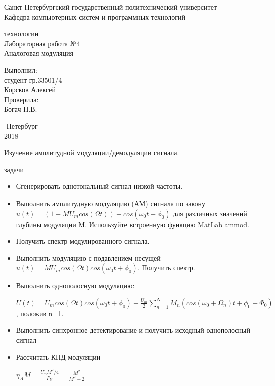 \documentclass[a4paper,12pt]{article}
\begin{document}
\begin{center}
Санкт-Петербургский государственный политехнический университет
\\Кафедра компьютерных систем и программных технологий
\end{center}
\vspace*{10em plus .6em minus .5em}

\begin{center}
{ технологии
\\Лабораторная работа №4
\\Аналоговая модуляция}
\end{center}

\vspace*{5em plus .6em minus .5em}
\begin{flushright}
Выполнил:\\студент гр.33501/4\\Корсков Алексей\\Проверила:\\Богач Н.В.
\end{flushright}

\vspace*{15em plus .6em minus .5em}
\begin{center}
{-Петербург
\\2018}
\end{center}
\pagestyle{empty}
\newpage
\pagestyle{plain}
{}

Изучение амплитудной модуляции/демодуляции сигнала.

{ задачи}

\begin{itemize}
	\item Сгенерировать однотональный сигнал низкой частоты.
	\item Выполнить амплитудную модуляцию (АМ) сигнала по закону $u(t)=(1+MU_mcos(\Omega t))+cos(\omega_0t+\phi_0)$ для различных значений глубины модуляции M. Используйте встроенную функцию
	MatLab ammod.
	\item Получить спектр модулированного сигнала.
	\item Выполнить модуляцию с подавлением несущей $u(t)=MU_mcos(\Omega t)cos(\omega_0 t+\phi_0)$. Получить спектр.
	\item  Выполнить однополосную модуляцию:
		
	$U(t)=U_mcos(\Omega t)cos(\omega_0t+\phi_0)+\frac{U_m}{2}\sum_{n=1}^{N}M_n(cos(\omega_0+\Omega_n)t+\phi_0+\Phi_0)$, положив n=1.
	\item Выполнить синхронное детектирование и получить исходный однополосный сигнал
	\item Рассчитать КПД модуляции
	
	$\eta_AM=\frac{U_m^2M^2/4}{P_U}=\frac{M^2}{M^2+2}$
\end{itemize}
\end{document}
